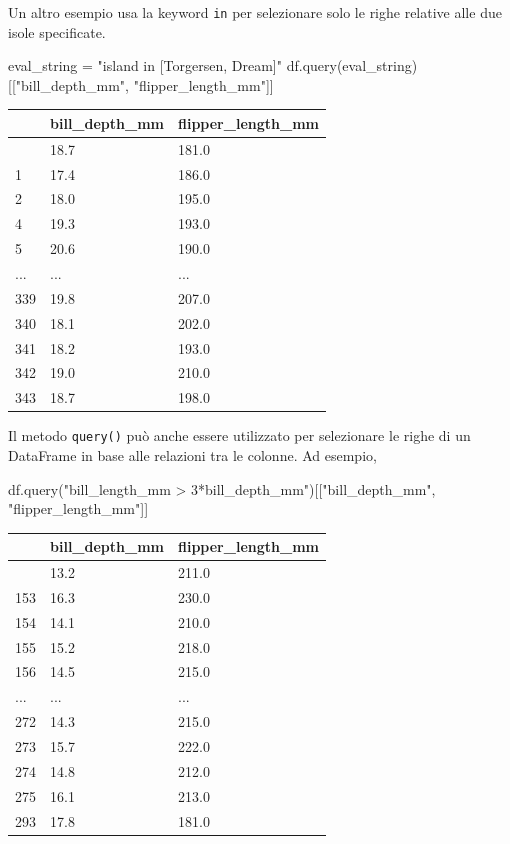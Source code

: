 \documentclass[
  letterpaper,
  krantz2]{{[}./krantz{]}}
\newenvironment{Shaded}{\begin{snugshade}}{\end{snugshade}}
\newcommand{\NormalTok}[1]{\textcolor[rgb]{0.00,0.23,0.31}{#1}}
\newcommand{\OperatorTok}[1]{\textcolor[rgb]{0.37,0.37,0.37}{#1}}
\newcommand{\StringTok}[1]{\textcolor[rgb]{0.13,0.47,0.30}{#1}}
\begin{document}
Un altro esempio usa la keyword \texttt{in} per selezionare solo le
righe relative alle due isole specificate.

\begin{Shaded}
\begin{Highlighting}[]
\NormalTok{eval\_string }\OperatorTok{=} \StringTok{"island in [\textquotesingle{}Torgersen\textquotesingle{}, \textquotesingle{}Dream\textquotesingle{}]"}
\NormalTok{df.query(eval\_string)[[}\StringTok{"bill\_depth\_mm"}\NormalTok{, }\StringTok{"flipper\_length\_mm"}\NormalTok{]]}
\end{Highlighting}
\end{Shaded}

\begin{longtable}[]{@{}lll@{}}
\toprule\noalign{}
& bill\_depth\_mm & flipper\_length\_mm \\
\midrule\noalign{}
\endhead
\bottomrule\noalign{}
\endlastfoot
0 & 18.7 & 181.0 \\
1 & 17.4 & 186.0 \\
2 & 18.0 & 195.0 \\
4 & 19.3 & 193.0 \\
5 & 20.6 & 190.0 \\
... & ... & ... \\
339 & 19.8 & 207.0 \\
340 & 18.1 & 202.0 \\
341 & 18.2 & 193.0 \\
342 & 19.0 & 210.0 \\
343 & 18.7 & 198.0 \\
\end{longtable}

Il metodo \texttt{query()} può anche essere utilizzato per selezionare
le righe di un DataFrame in base alle relazioni tra le colonne. Ad
esempio,

\begin{Shaded}
\begin{Highlighting}[]
\NormalTok{df.query(}\StringTok{"bill\_length\_mm \textgreater{} 3*bill\_depth\_mm"}\NormalTok{)[[}\StringTok{"bill\_depth\_mm"}\NormalTok{, }\StringTok{"flipper\_length\_mm"}\NormalTok{]]}
\end{Highlighting}
\end{Shaded}

\begin{longtable}[]{@{}lll@{}}
\toprule\noalign{}
& bill\_depth\_mm & flipper\_length\_mm \\
\midrule\noalign{}
\endhead
\bottomrule\noalign{}
\endlastfoot
152 & 13.2 & 211.0 \\
153 & 16.3 & 230.0 \\
154 & 14.1 & 210.0 \\
155 & 15.2 & 218.0 \\
156 & 14.5 & 215.0 \\
... & ... & ... \\
272 & 14.3 & 215.0 \\
273 & 15.7 & 222.0 \\
274 & 14.8 & 212.0 \\
275 & 16.1 & 213.0 \\
293 & 17.8 & 181.0 \\
\end{longtable}
\end{document}
